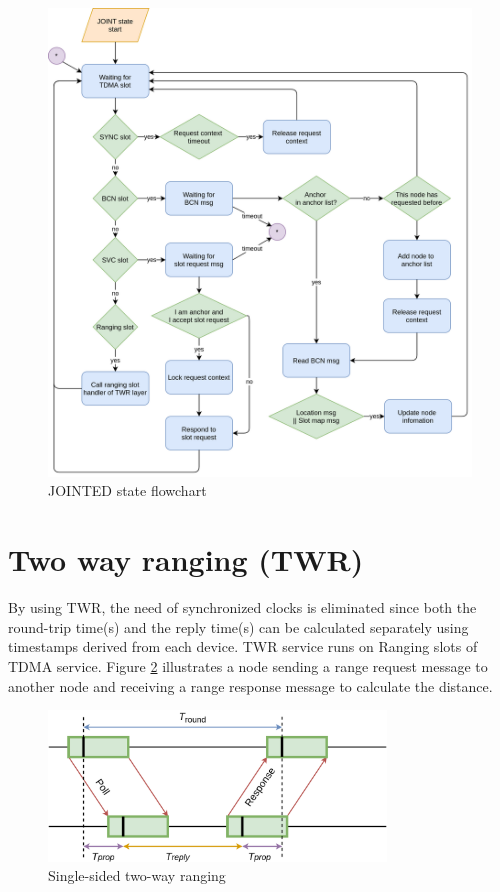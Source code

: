 \documentclass[\main/main.tex]{subfiles}
\begin{document}
\begin{figure}[H]
    \begin{center}
        \includegraphics[scale=0.32]{JOINTED_state_flow_chart.png}
    \end{center}
    \caption{JOINTED state flowchart}
    \label{fig:JOINTED_state_flowchart}
\end{figure}

\section{Two way ranging (TWR)}
By using TWR, the need of synchronized clocks is eliminated since both the round-trip time(s) and the reply time(s) can be calculated separately using timestamps derived from each device. TWR service runs on Ranging slots of TDMA service. Figure \ref{fig:single_sided_two_way_ranging} illustrates a node sending a range request message to another node and receiving a range response message to calculate the distance.

\begin{figure}[H]
    \begin{center}
        \includegraphics[width=0.8\textwidth]{single_sided_two_way_ranging.png}
    \end{center}
    \caption{Single-sided two-way ranging}
    \label{fig:single_sided_two_way_ranging}
\end{figure}
\end{document}
